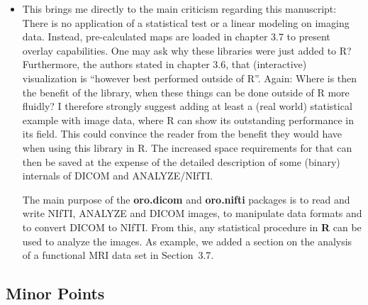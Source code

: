 \documentclass[11pt]{article}
\begin{document}
\begin{itemize}

\item This brings me directly to the main criticism regarding this
  manuscript: There is no application of a statistical test or a
  linear modeling on imaging data.  Instead, pre-calculated maps are
  loaded in chapter 3.7 to present overlay capabilities.  One may ask
  why these libraries were just added to R?  Furthermore, the authors
  stated in chapter 3.6, that (interactive) visualization is ``however
  best performed outside of R''.  Again: Where is then the benefit of
  the library, when these things can be done outside of R more
  fluidly?
  I therefore strongly suggest adding at least a (real world)
  statistical example with image data, where R can show its
  outstanding performance in its field.  This could convince the
  reader from the benefit they would have when using this library in
  R. The increased space requirements for that can then be saved at
  the expense of the detailed description of some (binary) internals
  of DICOM and ANALYZE/NIfTI.

  The main purpose of the \textbf{oro.dicom} and \textbf{oro.nifti}
  packages is to read and write NIfTI, ANALYZE and DICOM images, to 
  manipulate data formats and to convert DICOM to NIfTI. From this, 
  any statistical procedure in \textbf{R} can be used to analyze the
  images. As example, we added a section on the analysis of a functional MRI 
  data set in Section~3.7.  

\end{itemize}

\subsection*{Minor Points}
\end{document}
